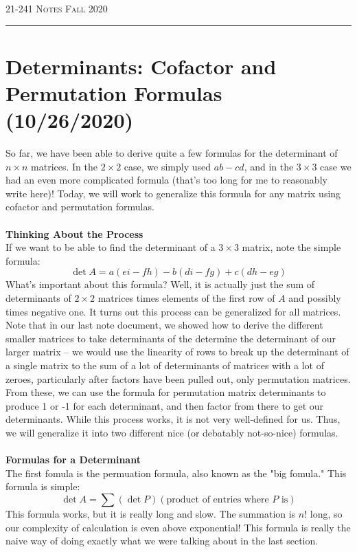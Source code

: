 \documentclass[12pt]{amsart}
\begin{document}
\thispagestyle{empty}

{\scshape 21-241} \hfill {\scshape \Large Notes} \hfill {\scshape Fall 2020}
\medskip
\hrule
\bigskip

\section*{Determinants: Cofactor and Permutation Formulas (10/26/2020)}
So far, we have been able to derive quite a few formulas for the determinant of $n \times n$ matrices. In the $2 \times 2$ case, we simply used $ab-cd$, and in the $3 \times 3$ case we had an even more complicated formula (that's too long for me to reasonably write here)! Today, we will work to generalize this formula for any matrix using cofactor and permutation formulas.\\ \\
\textbf{Thinking About the Process}\\
 If we want to be able to find the determinant of a $3 \times 3$ matrix, note the simple formula:
 \[\det A = a(ei-fh) - b(di-fg) + c(dh-eg)\]
What's important about this formula? Well, it is actually just the sum of determinants of $2 \times 2$ matrices times elements of the first row of $A$ and possibly times negative one. It turns out this process can be generalized for all matrices. Note that in our last note document, we showed how to derive the different smaller matrices to take determinants of the determine the determinant of our larger matrix -- we would use the linearity of rows to break up the determinant of a single matrix to the sum of a lot of determinants of matrices with a lot of zeroes, particularly after factors have been pulled out, only permutation matrices. From these, we can use the formula for permutation matrix determinants to produce 1 or -1 for each determinant, and then factor from there to get our determinants. While this process works, it is not very well-defined for us. Thus, we will generalize it into two different nice (or debatably not-so-nice) formulas. \\ \\
\textbf{Formulas for a Determinant}\\
The first fomula is the permuation formula, also known as the "big fomula." This formula is simple:
\[\det A = \sum (\det P)(\text{product of entries where $P$ is})\]
This formula works, but it is really long and slow. The summation is $n!$ long, so our complexity of calculation is even above exponential! This formula is really the naive way of doing exactly what we were talking about in the last section.\\
\end{document}
